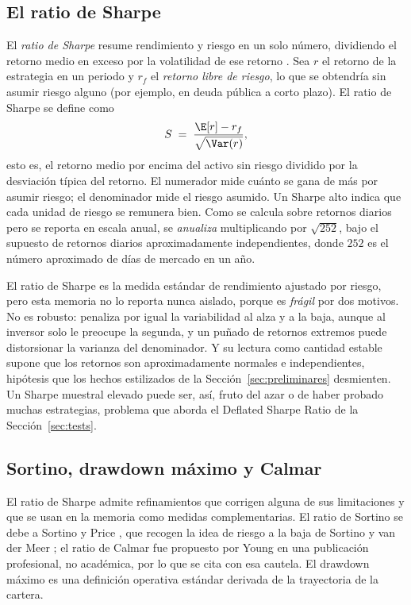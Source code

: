 \subsection{El ratio de Sharpe}
\label{sec:economia-sharpe}

El \emph{ratio de Sharpe} resume rendimiento y riesgo en un solo número, dividiendo el retorno medio en exceso por la volatilidad de ese retorno \cite{sharpe1994}. Sea $r$ el retorno de la estrategia en un periodo y $r_f$ el \emph{retorno libre de riesgo}, lo que se obtendría sin asumir riesgo alguno (por ejemplo, en deuda pública a corto plazo). El ratio de Sharpe se define como
\[
S \;=\; \frac{\E[r] - r_f}{\sqrt{\Var(r)}},
\]
esto es, el retorno medio por encima del activo sin riesgo dividido por la desviación típica del retorno. El numerador mide cuánto se gana de más por asumir riesgo; el denominador mide el riesgo asumido. Un Sharpe alto indica que cada unidad de riesgo se remunera bien. Como se calcula sobre retornos diarios pero se reporta en escala anual, se \emph{anualiza} multiplicando por $\sqrt{252}$, bajo el supuesto de retornos diarios aproximadamente independientes, donde $252$ es el número aproximado de días de mercado en un año.

El ratio de Sharpe es la medida estándar de rendimiento ajustado por riesgo, pero esta memoria no lo reporta nunca aislado, porque es \emph{frágil} por dos motivos. No es robusto: penaliza por igual la variabilidad al alza y a la baja, aunque al inversor solo le preocupe la segunda, y un puñado de retornos extremos puede distorsionar la varianza del denominador. Y su lectura como cantidad estable supone que los retornos son aproximadamente normales e independientes, hipótesis que los hechos estilizados de la Sección~\ref{sec:preliminares} desmienten. Un Sharpe muestral elevado puede ser, así, fruto del azar o de haber probado muchas estrategias, problema que aborda el Deflated Sharpe Ratio de la Sección~\ref{sec:tests}.

\subsection{Sortino, drawdown máximo y Calmar}
\label{sec:economia-otros}

El ratio de Sharpe admite refinamientos que corrigen alguna de sus limitaciones y que se usan en la memoria como medidas complementarias. El ratio de Sortino se debe a Sortino y Price \cite{sortino1994}, que recogen la idea de riesgo a la baja de Sortino y van der Meer \cite{sortino1991}; el ratio de Calmar fue propuesto por Young \cite{young1991} en una publicación profesional, no académica, por lo que se cita con esa cautela. El drawdown máximo es una definición operativa estándar derivada de la trayectoria de la cartera.

